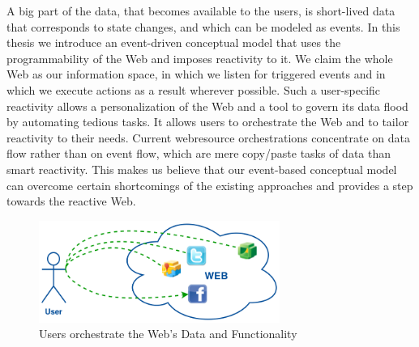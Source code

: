 A big part of the data, that becomes available to the users, is short-lived data that corresponds to state changes, and which can be modeled as events.
In this thesis we introduce an event-driven conceptual model that uses the programmability of the Web and imposes reactivity to it.
We claim the whole Web as our information space, in which we listen for triggered events and in which we execute actions as a result wherever possible.
Such a user-specific reactivity allows a personalization of the Web and a tool to govern its data flood by automating tedious tasks.
It allows users to orchestrate the Web and to tailor reactivity to their needs.
Current \textrm{\gls{webresource}} orchestrations concentrate on data flow rather than on event flow, which are mere copy/paste tasks of data than smart reactivity.
This makes us believe that our event-based conceptual model can overcome certain shortcomings of the existing approaches and provides a step towards the reactive Web.


\begin{figure}[!ht]
  \centering
  \includegraphics[width=0.7\textwidth]{figures/UsersWeildServicesInTheWeb}
  \caption{Users orchestrate the Web's Data and Functionality}
  \label{fig:UsersWeildServicesInTheWeb}
\end{figure}



